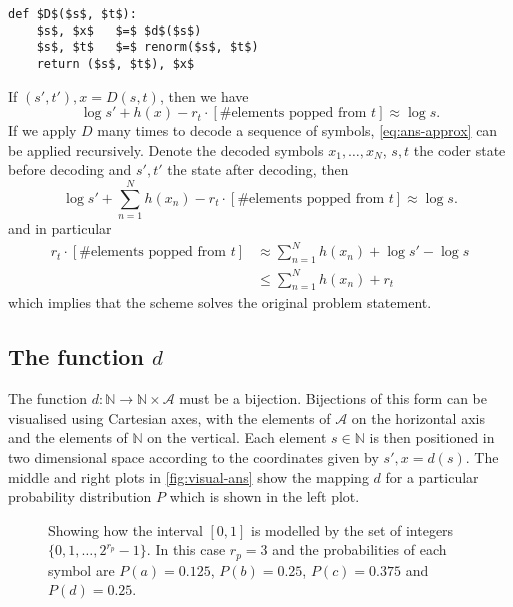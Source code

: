 \documentclass{article}
\begin{document}
\begin{lstlisting}
def $D$($s$, $t$):
    $s$, $x$   $=$ $d$($s$)
    $s$, $t$   $=$ renorm($s$, $t$)
    return ($s$, $t$), $x$
\end{lstlisting}
If $(s', t'), x = D(s, t)$, then we have
\begin{equation}\label{eq:ans-approx}
        \log s' + h(x) - r_t\cdot\left[\text{\# elements popped from $t$}\right]
        \approx \log s.
\end{equation}
If we apply $D$ many times to decode a sequence of symbols,
\cref{eq:ans-approx} can be applied recursively. Denote the decoded symbols
$x_1, \ldots, x_N$, $s, t$ the coder state before decoding and $s', t'$ the
state after decoding, then
\begin{equation}
        \log s' + \sum_{n=1}^Nh(x_n) - r_t\cdot\left[\text{\# elements popped
        from $t$}\right] \approx \log s.
\end{equation}
and in particular
\begin{align}
         r_t\cdot\left[\text{\# elements popped
         from $t$}\right] &\approx \sum_{n=1}^Nh(x_n) + \log s' - \log s\\
                          &\leq \sum_{n=1}^Nh(x_n) + r_t
\end{align}
which implies that the scheme solves the original problem statement.

\subsection*{The function $d$}\label{sec:inner-decoder}
The function $d:\mathbb{N}\rightarrow\mathbb{N}\times\mathcal{A}$ must be a
bijection. Bijections of this form can be visualised using Cartesian axes, with
the elements of $\mathcal{A}$ on the horizontal axis and the elements of
$\mathbb{N}$ on the vertical. Each element $s\in\mathbb{N}$ is then positioned
in two dimensional space according to the coordinates given by $s', x = d(s)$.
The middle and right plots in \cref{fig:visual-ans} show the mapping $d$ for a
particular probability distribution $P$ which is shown in the left plot.
\begin{figure}
  \centering
  \drawinterval
  \caption{
    Showing how the interval $[0, 1]$ is modelled by the set of integers $\{0,
    1, \ldots, 2^{r_p} - 1\}$. In this case $r_p = 3$ and the probabilities of
    each symbol are $P(a) = 0.125$, $P(b) = 0.25$, $P(c) = 0.375$ and $P(d) =
    0.25$.
  }
\end{figure}
\end{document}
